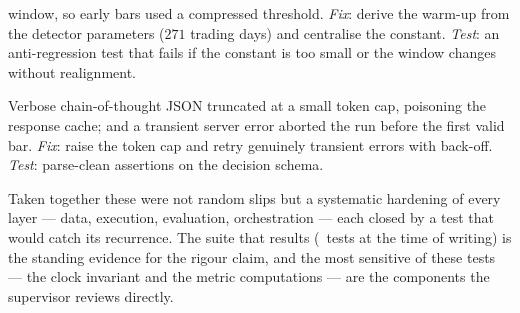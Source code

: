 \begin{description}
  window, so early bars used a compressed threshold. \emph{Fix}: derive the warm-up from the
  detector parameters ($271$ trading days) and centralise the constant. \emph{Test}: an
  anti-regression test that fails if the constant is too small or the window changes without
  realignment.
  \item[Token truncation and transient API errors.] Verbose chain-of-thought JSON truncated
  at a small token cap, poisoning the response cache; and a transient server error aborted the
  run before the first valid bar. \emph{Fix}: raise the token cap and retry genuinely
  transient errors with back-off. \emph{Test}: parse-clean assertions on the decision schema.
\end{description}

Taken together these were not random slips but a systematic hardening of every layer ---
data, execution, evaluation, orchestration --- each closed by a test that would catch its
recurrence. The suite that results (\nTests\ tests at the time of writing) is the standing
evidence for the rigour claim, and the most sensitive of these tests --- the clock invariant
and the metric computations --- are the components the supervisor reviews directly.
